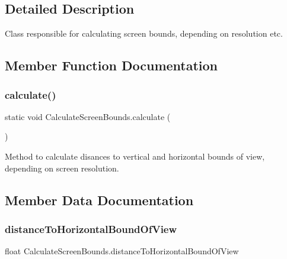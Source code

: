 \subsection{Detailed Description}
Class responsible for calculating screen bounds, depending on resolution etc. 



\subsection{Member Function Documentation}
\mbox{\label{class_calculate_screen_bounds_a158fa098e4529b299f223bb0e241ccc8}} 
\subsubsection{\texorpdfstring{calculate()}{calculate()}}
{\footnotesize\ttfamily static void Calculate\+Screen\+Bounds.\+calculate (\begin{DoxyParamCaption}{ }\end{DoxyParamCaption})\hspace{0.3cm}{\ttfamily [static]}}



Method to calculate disances to vertical and horizontal bounds of view, depending on screen resolution. 



\subsection{Member Data Documentation}
\mbox{\label{class_calculate_screen_bounds_a439f514c9f28391b0b90ad9b8050e35a}} 
\subsubsection{\texorpdfstring{distance\+To\+Horizontal\+Bound\+Of\+View}{distanceToHorizontalBoundOfView}}
{\footnotesize\ttfamily float Calculate\+Screen\+Bounds.\+distance\+To\+Horizontal\+Bound\+Of\+View\hspace{0.3cm}{\ttfamily [static]}}



